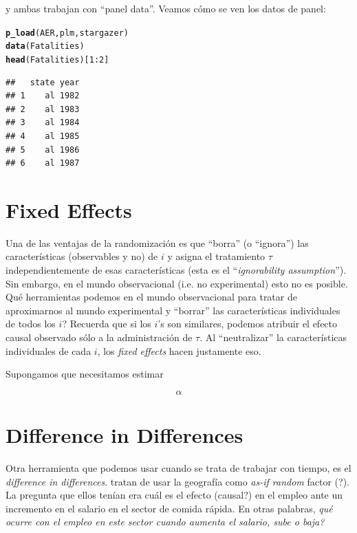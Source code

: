 \documentclass[onesided]{article}\usepackage[]{graphicx}\usepackage[]{color}
\makeatletter
\newcommand{\hlnum}[1]{\textcolor[rgb]{0.686,0.059,0.569}{#1}}%
\newcommand{\hlopt}[1]{\textcolor[rgb]{0,0,0}{#1}}%
\newcommand{\hlstd}[1]{\textcolor[rgb]{0.345,0.345,0.345}{#1}}%
\newcommand{\hlkwd}[1]{\textcolor[rgb]{0.737,0.353,0.396}{\textbf{#1}}}%
\newenvironment{kframe}{%
 \def\at@end@of@kframe{}%
 \ifinner\ifhmode%
  \def\at@end@of@kframe{\end{minipage}}%
  \begin{minipage}{\columnwidth}%
 \fi\fi%
 \def\FrameCommand##1{\hskip\@totalleftmargin \hskip-\fboxsep
 \colorbox{shadecolor}{##1}\hskip-\fboxsep
     \hskip-\linewidth \hskip-\@totalleftmargin \hskip\columnwidth}%
 \MakeFramed {\advance\hsize-\width
   \@totalleftmargin\z@ \linewidth\hsize
   \@setminipage}}%
 {\par\unskip\endMakeFramed%
 \at@end@of@kframe}
\newenvironment{knitrout}{}{} %
\makeatother
\begin{document}
y ambas trabajan con ``panel data''. Veamos c\'omo se ven los datos de panel:

\begin{knitrout}
\color{fgcolor}\begin{kframe}
\begin{alltt}
\hlkwd{p_load}\hlstd{(AER, plm, stargazer)}
\hlkwd{data}\hlstd{(Fatalities)}
\hlkwd{head}\hlstd{(Fatalities)[}\hlnum{1}\hlopt{:}\hlnum{2}\hlstd{]}
\end{alltt}
\begin{verbatim}
##   state year
## 1    al 1982
## 2    al 1983
## 3    al 1984
## 4    al 1985
## 5    al 1986
## 6    al 1987
\end{verbatim}
\end{kframe}
\end{knitrout}



\section{Fixed Effects}

Una de las ventajas de la randomizaci\'on es que ``borra'' (o ``ignora'') las caracter\'isticas (observables y no) de $i$ y asigna el tratamiento $\tau$ independientemente de esas caracter\'isticas (esta es el ``\emph{ignorability assumption}''). Sin embargo, en el mundo observacional (i.e. no experimental) esto no es posible. Qu\'e herramientas podemos en el mundo observacional para tratar de aproximarnos al mundo experimental y ``borrar'' las caracter\'isticas individuales de todos los $i$? Recuerda que si los $i$'s son similares, podemos atribuir el efecto causal observado s\'olo a la administraci\'on de $\tau$. Al ``neutralizar'' la caracter\'isticas individuales de cada $i$, los \emph{fixed effects} hacen justamente eso. 

Supongamos que necesitamos estimar 

\begin{equation}\label{fe}
\alpha
\end{equation}


\section{Difference in Differences}

Otra herramienta que podemos usar cuando se trata de trabajar con tiempo, es el \emph{difference in differences}. \textcite{Card1994} tratan de usar la geograf\'ia como \emph{as-if random} factor ({\color{red}?}). La pregunta que ellos ten\'ian era cu\'al es el efecto (causal?) en el empleo ante un incremento en el salario en el sector de comida r\'apida. En otras palabras, \emph{qu\'e ocurre con el empleo en este sector cuando aumenta el salario, sube o baja?}
\end{document}
